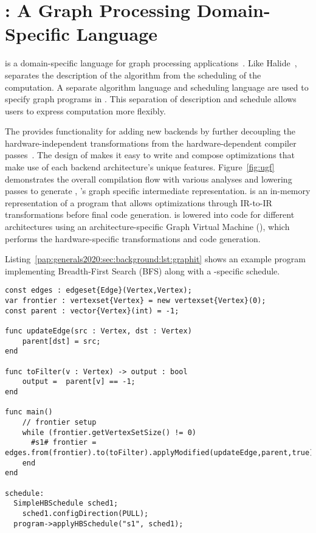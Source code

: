 
\section{\graphit: A Graph Processing Domain-Specific Language}\label{pap:generals2020:sec:graphit}
\ugfoverview
\graphit is a domain-specific language for graph processing applications~\citep{zhang2018graphit,brahmakshatriya2021compiling,zhang2019optimizing}.
Like Halide~\citep{ragan2013halide}, \graphit separates the description of the algorithm from the scheduling of the computation. 
A separate algorithm language and scheduling language are used to specify graph programs in \graphit. 
This separation of description and schedule allows users to express computation more flexibly.

The \ugc provides functionality for adding new backends by further decoupling the hardware-independent transformations from the hardware-dependent compiler passes~\cite{brahmakshatriya2021taming}.
The design of \ugc makes it easy to write and compose optimizations that make use of each backend architecture's unique features.
Figure~\ref{fig:ugf} demonstrates the overall compilation flow with various analyses and lowering passes to generate \graphisa, \graphit's graph specific intermediate representation.
\graphisa is an in\hyp{}memory representation of a program that allows optimizations through IR-to-IR transformations before final code generation.
\graphisa is lowered into code for different architectures using an architecture-specific Graph Virtual Machine (\graphvm), which performs the hardware-specific transformations and code generation.

Listing~\ref{pap:generals2020:sec:background:lst:graphit} shows an example \graphit program implementing Breadth-First Search (BFS) along with a \hb-specific schedule.
\hfill
\break 
\begin{lstlisting}[language=graphit, 
                   caption=\graphit code for Breadth-First Search (BFS) with a \hbmc schedule.,
                   label=pap:generals2020:sec:background:lst:graphit]
const edges : edgeset{Edge}(Vertex,Vertex);
var frontier : vertexset{Vertex} = new vertexset{Vertex}(0);
const parent : vector{Vertex}(int) = -1;

func updateEdge(src : Vertex, dst : Vertex)
    parent[dst] = src;
end

func toFilter(v : Vertex) -> output : bool
    output =  parent[v] == -1;
end

func main()
    // frontier setup
    while (frontier.getVertexSetSize() != 0)
      #s1# frontier = edges.from(frontier).to(toFilter).applyModified(updateEdge,parent,true);
    end
end

schedule:
  SimpleHBSchedule sched1;
    sched1.configDirection(PULL);
  program->applyHBSchedule("s1", sched1);
\end{lstlisting}

